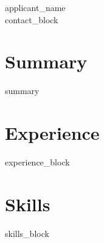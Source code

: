 \documentclass[11pt]{article}
\begin{document}
\begin{center}
{\LARGE {{applicant_name}}}\\
{{contact_block}}
\end{center}

\section*{Summary}
{{summary}}

\section*{Experience}
{{experience_block}}

\section*{Skills}
{{skills_block}}
\end{document}

